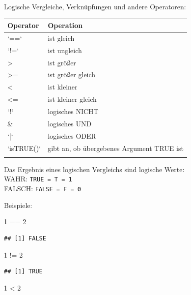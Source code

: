 \documentclass[
]{book}
\newenvironment{Shaded}{\begin{snugshade}}{\end{snugshade}}
\newcommand{\DecValTok}[1]{\textcolor[rgb]{0.00,0.00,0.81}{#1}}
\newcommand{\SpecialCharTok}[1]{\textcolor[rgb]{0.00,0.00,0.00}{#1}}
\begin{document}
Logische Vergleiche, Verknüpfungen und andere Operatoren:

\begin{table}[H]
\centering\begingroup\fontsize{15}{17}\selectfont

\begin{tabular}[t]{l|l}
\hline
Operator & Operation\\
\hline
`==` & ist gleich\\
\hline
`!=` & ist ungleich\\
\hline
> & ist größer\\
\hline
>= & ist größer gleich\\
\hline
< & ist kleiner\\
\hline
<= & ist kleiner gleich\\
\hline
`!` & logisches NICHT\\
\hline
\& & logisches UND\\
\hline
`|` & logisches ODER\\
\hline
`isTRUE()` & gibt an, ob übergebenes Argument TRUE ist\\
\hline
 & \\
\hline
\end{tabular}
\endgroup{}
\end{table}

Das Ergebnis eines logischen Vergleichs sind logische Werte:\\
WAHR: \texttt{TRUE\ =\ T\ =\ 1}\\
FALSCH: \texttt{FALSE\ =\ F\ =\ 0}

Beispiele:

\begin{Shaded}
\begin{Highlighting}[]
\DecValTok{1} \SpecialCharTok{==} \DecValTok{2}
\end{Highlighting}
\end{Shaded}

\begin{verbatim}
## [1] FALSE
\end{verbatim}

\begin{Shaded}
\begin{Highlighting}[]
\DecValTok{1} \SpecialCharTok{!=} \DecValTok{2}
\end{Highlighting}
\end{Shaded}

\begin{verbatim}
## [1] TRUE
\end{verbatim}

\begin{Shaded}
\begin{Highlighting}[]
\DecValTok{1} \SpecialCharTok{\textless{}} \DecValTok{2}
\end{Highlighting}
\end{Shaded}
\end{document}
